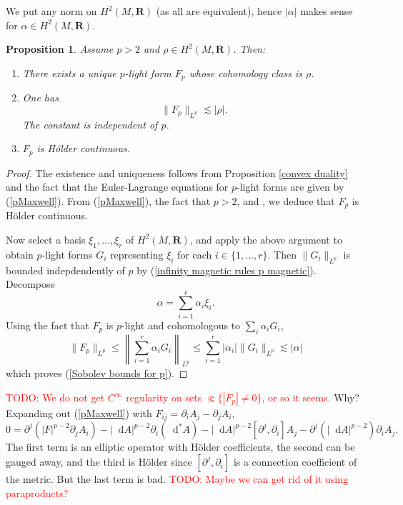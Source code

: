 \documentclass[reqno,11pt]{amsart}
\newcommand{\RR}{\mathbf{R}}
\newcommand*\dif{\mathop{}\!\mathrm{d}}
\newtheorem{proposition}[theorem]{Proposition}
\theoremstyle{definition}
\numberwithin{equation}{section}
\newcommand\todo[1]{\textcolor{red}{TODO: #1}}
\begin{document}
We put any norm on $H^2(M, \RR)$ (as all are equivalent), hence $|\alpha|$ makes sense for $\alpha \in H^2(M, \RR)$.

\begin{proposition}\label{existence for p}
Assume $p > 2$ and $\rho \in H^2(M, \RR)$.
Then:
\begin{enumerate}
\item There exists a unique $p$-light form $F_p$ whose cohomology class is $\rho$.
\item One has
\begin{equation}\label{Sobolev bounds for p}
	\|F_p\|_{L^p} \lesssim |\rho|.
\end{equation}
The constant is independent of $p$.
\item $F_p$ is H\"older continuous.
\end{enumerate}
\end{proposition}
\begin{proof}
The existence and uniqueness follows from Proposition \ref{convex duality} and the fact that the Euler-Lagrange equations for $p$-light forms are given by (\ref{pMaxwell}).
From (\ref{pMaxwell}), the fact that $p > 2$, and \cite{Uhlenbeck77}, we deduce that $F_p$ is H\"older continuous.

Now select a basis $\xi_1, \dots, \xi_r$ of $H^2(M, \RR)$, and apply the above argument to obtain $p$-light forms $G_i$ representing $\xi_i$ for each $i \in \{1, \dots, r\}$.
Then $\|G_i\|_{L^p}$ is bounded indepdendently of $p$ by (\ref{infinity magnetic rules p magnetic}).
Decompose
$$\alpha = \sum_{i=1}^r \alpha_i \xi_i.$$
Using the fact that $F_p$ is $p$-light and cohomologous to $\sum_i \alpha_i G_i$,
$$\|F_p\|_{L^p} \leq \left\|\sum_{i=1}^r \alpha_i G_i\right\|_{L^p} \leq \sum_{i=1}^r |\alpha_i| \|G_i\|_{L^p} \lesssim |\alpha|$$
which proves (\ref{Sobolev bounds for p}).
\end{proof}

\todo{We do not get $C^\infty$ regularity on sets $\Subset \{|F_p| \neq 0\}$, or so it seems.}
Why?
Expanding out (\ref{pMaxwell}) with $F_{ij} = \partial_i A_j - \partial_j A_i$,
$$0 = \partial^j(|F|^{p - 2} \partial_j A_i) - |\dif A|^{p - 2} \partial_i (\dif^* A) - |\dif A|^{p - 2} [\partial^j, \partial_i] A_j - \partial^j(|\dif A|^{p - 2}) \partial_i A_j.$$
The first term is an elliptic operator with H\"older coefficients, the second can be gauged away, and the third is H\"older since $[\partial^j, \partial_i]$ is a connection coefficient of the metric.
But the last term is bad.
\todo{Maybe we can get rid of it using paraproducts?}
\end{document}
